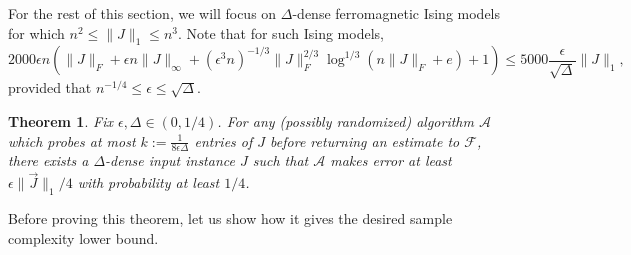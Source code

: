 \documentclass[final, 12pt]{colt2018}
\newcommand{\F}{\mathcal{F}}
\newtheorem{theorem}{Theorem}[section]
\theoremstyle{definition}
\theoremstyle{plain}
\begin{document}
For the rest of this section, we will focus on $\Delta$-dense ferromagnetic Ising models for which $n^2 \leq \|J\|_{1} \leq n^3$. 
Note that for such Ising models, 
$$2000\epsilon n \left(\|J\|_F + \epsilon n \|J\|_{\infty} + (\epsilon^3 n)^{-1/3}\|J\|_{F}^{2/3}\log^{1/3}(n\|J\|_F + e) + 1\right) \leq 5000\frac{\epsilon}{\sqrt{\Delta}}\|J\|_{1},$$
provided that $n^{-1/4} \leq \epsilon \leq \sqrt{\Delta}$. 

\begin{theorem}\label{thm-qualitative-tightness}
Fix $\epsilon, \Delta \in (0,1/4)$. For any (possibly randomized) algorithm
$\mathcal A$ which probes at most $k := \frac{1}{8\epsilon \Delta}$ entries
of $J$ before returning an estimate to $\F$, there exists a $\Delta$-dense
input instance $J$ such that $\mathcal A$ makes error at least $\epsilon \|\vec J\|_1/4$ with probability at least $1/4$.
\iffalse
Let $k$ be an arbitrary positive integer, and
let $\mathcal A$ be any (possibly randomized) algorithm which probes
at most $k$ entries of $J$ before returning an estimate to $\log Z$. 
There exists an $\Omega(1/k)$-dense input instance $J$ 
where $\mathcal A$ makes error at least
$\|\vec J\|_1/4$ with probability at least $1/4$.
\fi
\end{theorem}

Before proving this theorem, let us show how it gives the desired sample complexity lower bound. 
\end{document}
